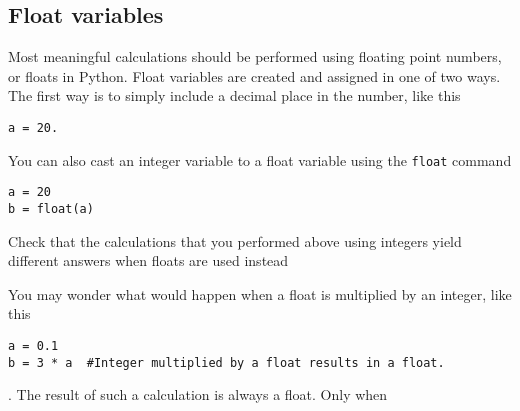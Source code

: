 \subsection*{Float variables}
Most meaningful calculations should be performed using floating point
numbers, or floats in Python.  Float variables are created and assigned in
one of two ways.  The first way is to simply include a decimal place
in the number, like this
\begin{Verbatim}
a = 20.
\end{Verbatim}
You can also cast an integer variable to a float variable using the
\texttt{float} command
\begin{Verbatim}
a = 20
b = float(a)
\end{Verbatim}
\begin{enumerate}
\prob Check that the calculations that you performed above using integers
yield different answers when floats are used instead
\end{enumerate}
You may wonder what would happen when a float is multiplied by an
integer, like this
\begin{Verbatim}
a = 0.1
b = 3 * a  #Integer multiplied by a float results in a float.
\end{Verbatim}
 .  The result of such a calculation is always a float.  Only when
